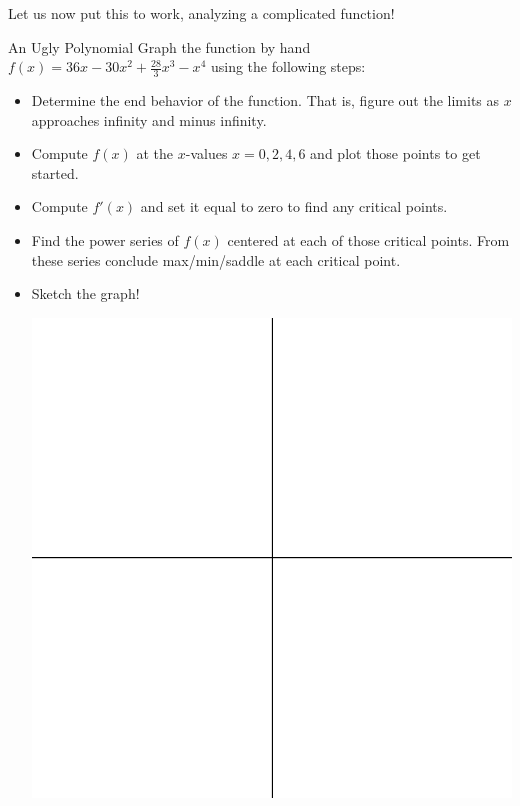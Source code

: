 Let us now put this to work, analyzing a complicated function!
\begin{exercise}{An Ugly Polynomial \Coffeecup \Coffeecup \Coffeecup}
Graph the function by hand $f(x)=36x-30x^2+\frac{28}{3}x^3-x^4$ using the following steps:

\begin{itemize}
\item Determine the end behavior of the function.  That is, figure out the limits as $x$ approaches infinity and minus infinity.
\vspace*{1in}
\item Compute $f(x)$ at the $x$-values $x=0,2,4,6$ and plot those points to get started.
\vspace*{1in}
\item Compute $f'(x)$ and set it equal to zero to find any critical points.
\vspace*{2in}
\item Find the power series of $f(x)$ centered at each of those critical points.  From these series conclude max/min/saddle at each critical point.  
\vspace*{2in}
\item Sketch the graph!
\begin{center}
\includegraphics[scale=0.5]{quadall}
\end{center}
\end{itemize}
\end{exercise}


